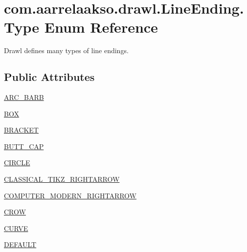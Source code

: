 \hypertarget{enumcom_1_1aarrelaakso_1_1drawl_1_1_line_ending_1_1_type}{}\section{com.\+aarrelaakso.\+drawl.\+Line\+Ending.\+Type Enum Reference}
\label{enumcom_1_1aarrelaakso_1_1drawl_1_1_line_ending_1_1_type}


Drawl defines many types of line endings.  


\subsection*{Public Attributes}
\begin{DoxyCompactItemize}
\item 
\hyperlink{enumcom_1_1aarrelaakso_1_1drawl_1_1_line_ending_1_1_type_ad58d73beccd7d4d4ab015eca51fbc508}{A\+R\+C\+\_\+\+B\+A\+RB}
\item 
\hyperlink{enumcom_1_1aarrelaakso_1_1drawl_1_1_line_ending_1_1_type_a1a09668e1434b10944872ae23112e058}{B\+OX}
\item 
\hyperlink{enumcom_1_1aarrelaakso_1_1drawl_1_1_line_ending_1_1_type_a2e689a2d9c5d72e21453e993b72d25d2}{B\+R\+A\+C\+K\+ET}
\item 
\hyperlink{enumcom_1_1aarrelaakso_1_1drawl_1_1_line_ending_1_1_type_a48e7e5ca4218f75225d453077cc5fb96}{B\+U\+T\+T\+\_\+\+C\+AP}
\item 
\hyperlink{enumcom_1_1aarrelaakso_1_1drawl_1_1_line_ending_1_1_type_af07aa0aa4f1de58f3eb19da4f8fc4ba2}{C\+I\+R\+C\+LE}
\item 
\hyperlink{enumcom_1_1aarrelaakso_1_1drawl_1_1_line_ending_1_1_type_a2ad7fc532e223e6160cc8ac18aea591c}{C\+L\+A\+S\+S\+I\+C\+A\+L\+\_\+\+T\+I\+K\+Z\+\_\+\+R\+I\+G\+H\+T\+A\+R\+R\+OW}
\item 
\hyperlink{enumcom_1_1aarrelaakso_1_1drawl_1_1_line_ending_1_1_type_ad62a65c0f5a67f55d55bb27e5b4d6d10}{C\+O\+M\+P\+U\+T\+E\+R\+\_\+\+M\+O\+D\+E\+R\+N\+\_\+\+R\+I\+G\+H\+T\+A\+R\+R\+OW}
\item 
\hyperlink{enumcom_1_1aarrelaakso_1_1drawl_1_1_line_ending_1_1_type_a737096505b608f3236b4a0dad32f72d2}{C\+R\+OW}
\item 
\hyperlink{enumcom_1_1aarrelaakso_1_1drawl_1_1_line_ending_1_1_type_a404e12e66371490b4e465777a3e9ff8c}{C\+U\+R\+VE}
\item 
\hyperlink{enumcom_1_1aarrelaakso_1_1drawl_1_1_line_ending_1_1_type_a60839eb2ed0486a6f9f987c64d27e313}{D\+E\+F\+A\+U\+LT}

\end{DoxyCompactItemize}
